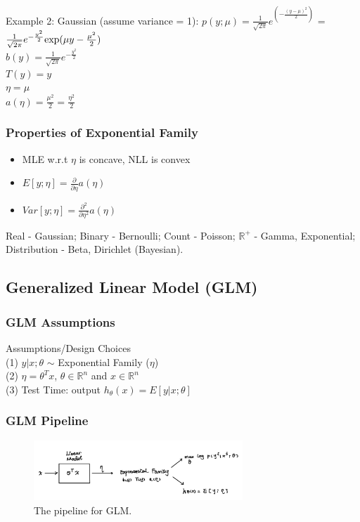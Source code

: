 \documentclass{article}
\begin{document}
\noindent
Example 2:
Gaussian (assume variance = 1): $p(y;\mu) = \frac{1}{\sqrt{2\pi}}e^{(-\frac{(y-\mu)^2}{2})}$
= $\frac{1}{\sqrt{2\pi}}e^{-\frac{y^2}{2}}{\rm exp}(\mu y-\frac{\mu^2}{2})$\\
$b(y) = \frac{1}{\sqrt{2\pi}}e^{-\frac{y^2}{2}}$\\
$T(y) = y$\\
$\eta = \mu$\\
$a(\eta) = \frac{\mu^2}{2} = \frac{\eta^2}{2}$

\subsubsection{Properties of Exponential Family}
\begin{itemize}[leftmargin=*, nosep]
  \item MLE w.r.t $\eta$ is concave, NLL is convex
  \item $E[y;\eta] = \frac{\partial}{\partial\eta}a(\eta)$
  \item $Var[y;\eta] = \frac{\partial^2}{\partial\eta^2}a(\eta)$
\end{itemize}
Real - Gaussian; Binary - Bernoulli; Count - Poisson; $\mathbb{R}^{+}$ - Gamma, Exponential; Distribution - Beta, Dirichlet (Bayesian).

\subsection{Generalized Linear Model (GLM)}
\subsubsection{GLM Assumptions}
Assumptions/Design Choices\\
(1) $y|x;\theta$ $\sim$ Exponential Family ($\eta$) \\
(2) $\eta = \theta^Tx$, $\theta \in \mathbb{R}^n$ and $x \in \mathbb{R}^n$ \\
(3) Test Time: output $h_\theta(x) = E[y|x;\theta]$
\subsubsection{GLM Pipeline}
\begin{figure}[H]
	\centerline{
   \includegraphics[width=0.7\textwidth]{Fig4.png}}
   \caption{The pipeline for GLM.}
   \label{fig:example}
\end{figure}
\end{document}
